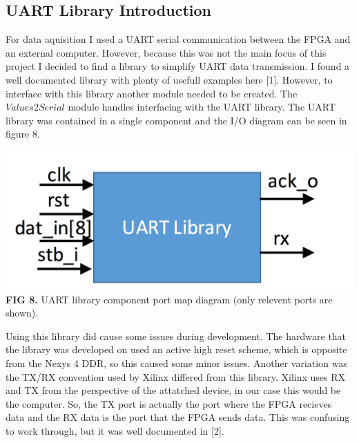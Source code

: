 \documentclass{article}
\begin{document}
\subsection{UART Library Introduction}
For data aquisition I used a UART serial communication between the FPGA and an external computer. However, because this was not the main focus of this project I decided to find a library to simplify UART data transmission. I found a well documented library with plenty of usefull examples here [1]. However, to interface with this library another module needed to be created. The $Values2Serial$ module handles interfacing with the UART library. The UART library was contained in a single component and the I/O diagram can be seen in figure 8.
\begin{center} 
\includegraphics[scale=.4]{images/uartIO}\\
\textbf{FIG 8.} UART library component port map diagram (only relevent ports are shown).\\
\end{center}
Using this library did cause some issues during development. The hardware that the library was developed on used an active high reset scheme, which is opposite from the Nexys 4 DDR, so this caused some minor issues. Another variation was the TX/RX convention used by Xilinx differed from this library. Xilinx uses RX and TX from the perspective of the attatched device, in our case this would be the computer. So, the TX port is actually the port where the FPGA recieves data and the RX data is the port that the FPGA sends data. This was confusing to work through, but it was well documented in [2].
\end{document}
